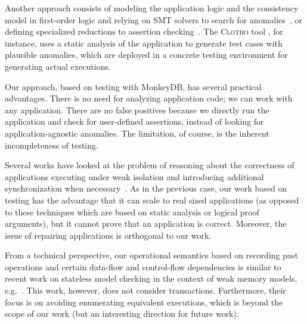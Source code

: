 Another approach consists of modeling the application
logic and the consistency model in first-order logic and relying on SMT solvers to
search for anomalies~\cite{DBLP:journals/pacmpl/KakiESJ18,DBLP:conf/concur/NagarJ18,burcu-netys},
or defining specialized reductions to assertion
checking~\cite{DBLP:conf/concur/BeillahiBE19,DBLP:conf/cav/BeillahiBE19}.
The \textsc{Clotho} tool \cite{DBLP:journals/pacmpl/RahmaniNDJ19}, for instance, uses a static analysis of the application to
generate test cases with plausible anomalies, which are deployed in a concrete
testing environment for generating actual executions. 

Our approach, based on testing with MonkeyDB, has several practical advantages.
There is no need for analyzing application code; we can work with any
application. There are no false positives because we directly run the
application and check for user-defined assertions, instead of looking for
application-agnostic anomalies. The limitation, of course, is
the inherent incompleteness of testing.

Several works have looked at the problem of reasoning about the correctness of
applications executing under weak isolation and introducing additional
synchronization when
necessary~\cite{DBLP:conf/eurosys/BalegasDFRPNS15,DBLP:conf/popl/GotsmanYFNS16,DBLP:conf/esop/NairP020,DBLP:conf/usenix/0001LCPRV14}.
As in the previous case, our work based on testing has the advantage that it can
scale to real sized applications (as opposed to these techniques which are based
on static analysis or logical proof arguments), but it cannot prove that an
application is correct. Moreover, the issue of repairing applications is
orthogonal to our work. 

From a technical perspective, our operational semantics based on recording past
operations and certain data-flow and control-flow dependencies is similar to
recent work on stateless model checking in the context of weak memory
models,
e.g.~\cite{DBLP:journals/pacmpl/Kokologiannakis18,DBLP:conf/tacas/AbdullaAAJLS15}.
This work, however, does not consider transactions. Furthermore, their focus is on
avoiding enumerating equivalent executions, which is beyond the scope of our
work (but an interesting direction for future work).

%

